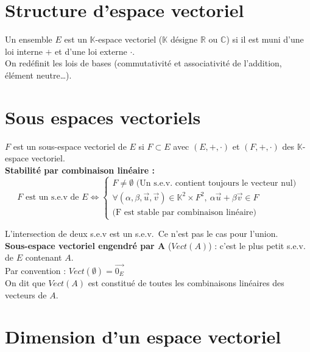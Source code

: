 \section{Structure d'espace vectoriel}\label{sec:structure-d'espace-vectoriel}
  
  Un ensemble $E$ est un $\mathbb K$-espace vectoriel ($\mathbb K$ désigne $\mathbb{R}$ ou $\mathbb{C}$) si il est muni d'une loi interne $\textbf{+}$ et d'une loi externe \textbf{$\cdot$}.\\
  
  On redéfinit les lois de bases (commutativité et associativité de l'addition, élément neutre\ldots).


\section{Sous espaces vectoriels}\label{sec:sous-espaces-vectoriels}
  
  $F$ est un sous-espace vectoriel de $E$ si $F \subset E$ avec $(E, +, \cdot)$ et $(F, +, \cdot)$ des $\mathbb K$-espace vectoriel.\\
  
  \textbf{Stabilité par combinaison linéaire :}
  \begin{equation}
    F \text{ est un s.e.v de } E \iff
    \begin{cases}
      F \neq \emptyset \text{ (Un s.e.v. contient toujours le vecteur nul)}\\
      \forall (\alpha, \beta, \vec u, \vec v) \in \mathbb{K}^2 \times F^2,\ \alpha \vec u + \beta \vec v \in F\\
      \text{(F est stable par combinaison linéaire)}
    \end{cases}\label{eq:equation2}
  \end{equation}
  
  L'intersection de deux s.e.v est un s.e.v.\ Ce n'est pas le cas pour l'union.\\
  
  \textbf{Sous-espace vectoriel engendré par A} ($Vect(A)$) : c'est le plus petit s.e.v. de $E$ contenant $A$.\\
  Par convention : $Vect(\emptyset) = {\vec{0_E}}$\\
  On dit que $Vect(A)$ est constitué de toutes les combinaisons linéaires des vecteurs de $A$.


\section{Dimension d'un espace vectoriel}\label{sec:dimension-d'un-espace-vectoriel}
  
